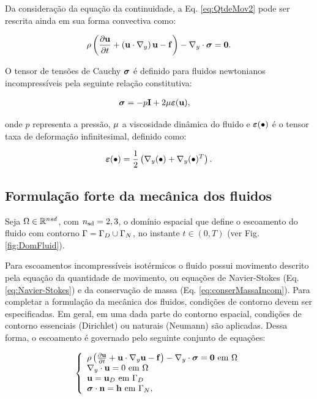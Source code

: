 \documentclass[tese_patricia]{subfiles}%
\begin{document}
Da consideração da equação da continuidade, a Eq. \ref{eq:QtdeMov2} pode ser rescrita ainda em sua forma convectiva como:

\begin{align}
	\rho\left(\frac{\partial\mathbf{u}}{\partial t} + \left( \mathbf{u} \cdot \nabla_y \right)  \mathbf{u}  - \mathbf{f} \right) - \nabla_y \cdot \boldsymbol{\sigma} = \mathbf{0}. \label{eq:Navier-Stokes} 
\end{align}

O tensor de tensões de Cauchy $\boldsymbol{\sigma}$ é definido para fluidos newtonianos incompressíveis pela seguinte relação constitutiva:

\begin{align}
\boldsymbol{\sigma} &= -p\mathbf{I} + 2\mu\bm{\varepsilon}(\mathbf{u}),\label{eq:StressTensor}
\end{align}

\noindent onde $p$ representa a pressão, $\mu$ a viscosidade dinâmica do fluido e $\bm{\varepsilon}(\bullet)$ é o tensor taxa de deformação infinitesimal, definido como:


\begin{align}
\bm{\varepsilon}(\bullet) = \frac{1}{2}\left(\nabla_y (\bullet) + \nabla_y (\bullet)^{T}\right). 
\label{eq:StrainTensor}
\end{align}

\subsection{Formulação forte da mecânica dos fluidos}

Seja $\Omega \in \mathbb{R}^{nsd}$, com ${n_{\mathrm{sd}}} = 2,3$, o domínio espacial que define o escoamento do fluido com contorno $\Gamma = \Gamma_D \cup \Gamma_N$, no instante $t \in (0,T)$ (ver Fig. \ref{fig:DomFluid}).

Para escoamentos incompressíveis isotérmicos o fluido possui movimento descrito pela equação da quantidade de movimento, ou equações de Navier-Stokes (Eq. \ref{eq:Navier-Stokes}) e da conservação de massa (Eq. \ref{eq:conserMassaIncom}). Para completar a formulação da mecânica dos fluidos, condições de contorno devem ser especificadas. Em geral, em uma dada parte do contorno espacial, condições de contorno essenciais (Dirichlet) ou naturais (Neumann) são aplicadas. Dessa forma, o escoamento é governado pelo seguinte conjunto de equações:

\begin{equation}
	\left\{
	\begin{array}{l}
		\density\left(\frac{\partial\velocity}{\partial t} + \velocity\cdot\nabla_y\velocity - \sbodyforce \right) - \nabla_y \cdot \stresstensor = \mathbf{0} \ \textrm{em} \ \domain\\
		\nabla_y \cdot \velocity = 0 \ \textrm{em} \ \domain\\
		\velocity = \velocityD \ \textrm{em} \ \GammaD \\
		\stresstensor \cdot \snormal = \surfaceLoad \ \textrm{em} \ \GammaN,
	\end{array} \label{eq:ConjDFC}
	\right.
\end{equation}
\end{document}
